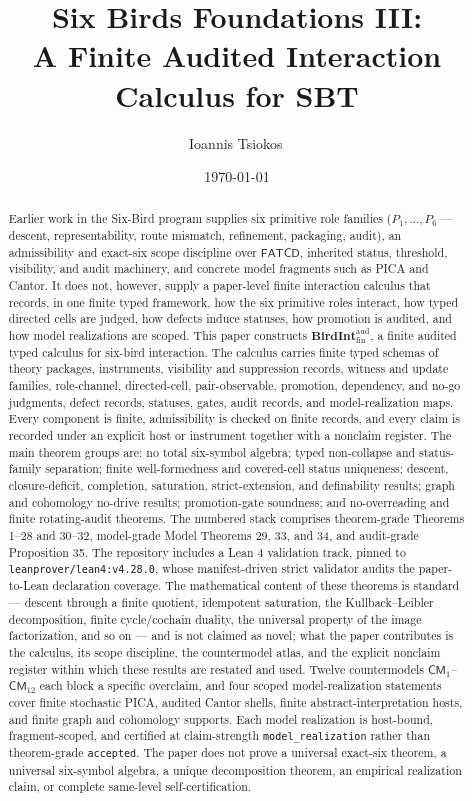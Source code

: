 \documentclass[11pt]{article}
\title{Six Birds Foundations III:\\
A Finite Audited Interaction Calculus for SBT}
\author{Ioannis Tsiokos\,\orcidlink{0009-0009-7659-5964}}
\date{\today}
\providecommand{\BirdInt}{\mathbf{BirdInt}^{\mathrm{aud}}_{\mathrm{fin}}}
\theoremstyle{definition}
\begin{document}
\maketitle
\thispagestyle{firstpage}

\begin{abstract}
Earlier work in the Six-Bird program supplies six primitive role families ($P_1,\ldots,P_6$ --- descent, representability, route mismatch, refinement, packaging, audit), an admissibility and exact-six scope discipline over $\mathsf{FATCD}$, inherited status, threshold, visibility, and audit machinery, and concrete model fragments such as PICA and Cantor. It does not, however, supply a paper-level finite interaction calculus that records, in one finite typed framework, how the six primitive roles interact, how typed directed cells are judged, how defects induce statuses, how promotion is audited, and how model realizations are scoped. This paper constructs $\BirdInt$, a finite audited typed calculus for six-bird interaction. The calculus carries finite typed schemas of theory packages, instruments, visibility and suppression records, witness and update families, role-channel, directed-cell, pair-observable, promotion, dependency, and no-go judgments, defect records, statuses, gates, audit records, and model-realization maps. Every component is finite, admissibility is checked on finite records, and every claim is recorded under an explicit host or instrument together with a nonclaim register. The main theorem groups are: no total six-symbol algebra; typed non-collapse and status-family separation; finite well-formedness and covered-cell status uniqueness; descent, closure-deficit, completion, saturation, strict-extension, and definability results; graph and cohomology no-drive results; promotion-gate soundness; and no-overreading and finite rotating-audit theorems. The numbered stack comprises theorem-grade Theorems 1--28 and 30--32, model-grade Model Theorems 29, 33, and 34, and audit-grade Proposition 35. The repository includes a Lean 4 validation track, pinned to \texttt{leanprover/lean4:v4.28.0}, whose manifest-driven strict validator audits the paper-to-Lean declaration coverage. The mathematical content of these theorems is standard --- descent through a finite quotient, idempotent saturation, the Kullback--Leibler decomposition, finite cycle/cochain duality, the universal property of the image factorization, and so on --- and is not claimed as novel; what the paper contributes is the calculus, its scope discipline, the countermodel atlas, and the explicit nonclaim register within which these results are restated and used. Twelve countermodels $\mathsf{CM}_1$--$\mathsf{CM}_{12}$ each block a specific overclaim, and four scoped model-realization statements cover finite stochastic PICA, audited Cantor shells, finite abstract-interpretation hosts, and finite graph and cohomology supports. Each model realization is host-bound, fragment-scoped, and certified at claim-strength \texttt{model\_realization} rather than theorem-grade \texttt{accepted}. The paper does not prove a universal exact-six theorem, a universal six-symbol algebra, a unique decomposition theorem, an empirical realization claim, or complete same-level self-certification.
\end{abstract}
\end{document}
